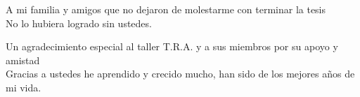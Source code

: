 \thispagestyle{empty}
{}

\vspace*{3cm}

\begin{center}
    A mi familia y amigos que no dejaron de molestarme con terminar la tesis \\
    No lo hubiera logrado sin ustedes.
\end{center}

\medskip

\begin{center}
    Un agradecimiento especial al taller T.R.A. y a sus miembros por su apoyo y amistad \\
    Gracias a ustedes he aprendido y crecido mucho, han sido de los mejores años de mi vida.
\end{center}